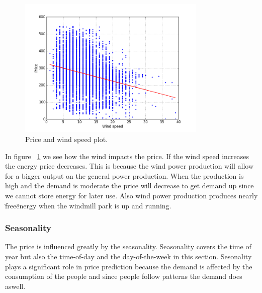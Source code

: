 \begin{figure}[H]
\centering
\includegraphics[width=0.8\textwidth ,natwidth=410,natheight=237]{billeder/energy_price_plots/price_wind.png}
\caption{Price and wind speed plot.}
\label{fig:price_wind}
\end{figure}

In figure ~\ref{fig:price_wind} we see how the wind impacts the price. If the wind speed increases the energy price decreases. This is because the wind power production will allow for a bigger output on the general power production. When the production is high and the demand is moderate the price will decrease to get demand up since we cannot store energy for later use. Also wind power production produces nearly \"free\" energy when the windmill park is up and running.

\subsubsection{Seasonality}
The price is influenced greatly by the seasonality. Seasonality covers the time of year but also the time-of-day and the day-of-the-week in this section. Sesonality plays a significant role in price prediction because the demand is affected by the consumption of the people and since people follow patterns the demand does aswell.

